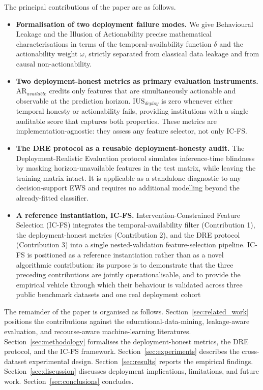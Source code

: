 \documentclass[a4paper,fleqn]{cas-sc}
\begin{document}
The principal contributions of the paper are as follows. 
\begin{itemize}
    \item \textbf{Formalisation of two deployment failure modes.} We give Behavioural Leakage and the Illusion of Actionability precise mathematical characterisations in terms of the temporal-availability function $\delta$ and the actionability weight $\omega$, strictly separated from classical data leakage and from causal non-actionability.

    \item \textbf{Two deployment-honest metrics as primary evaluation
    instruments.}
    $\mathrm{AR}_{available}$ credits only features that are simultaneously actionable and observable at the prediction horizon. $\mathrm{IUS}_{deploy}$ is zero whenever either temporal honesty or actionability fails, providing institutions with a single auditable score that captures both properties. These metrics are implementation-agnostic: they assess any feature selector, not only IC-FS.
     
    \item \textbf{The DRE protocol as a reusable deployment-honesty audit.}
    The Deployment-Realistic Evaluation protocol simulates inference-time blindness by masking horizon-unavailable features in the test matrix, while leaving the training matrix intact. It is applicable as a standalone diagnostic to any decision-support EWS and requires no additional modelling beyond the already-fitted classifier. 
    \item \textbf{A reference instantiation, IC-FS.} Intervention-Constrained Feature Selection (IC-FS) integrates the temporal-availability filter (Contribution 1), the deployment-honest metrics (Contribution 2), and the DRE protocol (Contribution 3) into a single nested-validation feature-selection pipeline. IC-FS is positioned as a reference instantiation rather than as a novel algorithmic contribution: its purpose is to demonstrate that the three preceding contributions are jointly operationalisable, and to provide the empirical vehicle through which their behaviour is validated across three public benchmark datasets and one real deployment cohort
\end{itemize}

The remainder of the paper is organised as follows. Section~\ref{sec:related_work} positions the contributions against the educational-data-mining, leakage-aware evaluation, and recourse-aware machine-learning literatures. Section~\ref{sec:methodology} formalises the deployment-honest metrics, the DRE protocol, and the IC-FS framework. Section~\ref{sec:experiments} describes the cross-dataset experimental design. Section~\ref{sec:results} reports the empirical findings. Section~\ref{sec:discussion} discusses deployment implications, limitations, and future work. Section~\ref{sec:conclusions} concludes.
\end{document}
